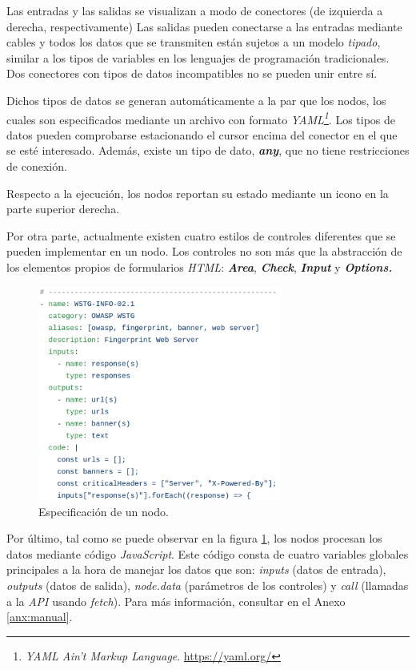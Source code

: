 Las entradas y las salidas se visualizan a modo de conectores (de izquierda a derecha, respectivamente) Las salidas pueden conectarse a las entradas mediante cables y todos los datos que se transmiten están sujetos a un modelo \textit{tipado}, similar a los tipos de variables en los lenguajes de programación tradicionales. Dos conectores con tipos de datos incompatibles no se pueden unir entre sí.\sn

Dichos tipos de datos se generan automáticamente a la par que los nodos, los cuales son especificados mediante un archivo con formato \textit{YAML\footnote{\textit{YAML Ain't Markup Language}. \url{https://yaml.org/}}}. Los tipos de datos pueden comprobarse estacionando el cursor encima del conector en el que se esté interesado. Además, existe un tipo de dato, \textbf{\textit{any}}, que no tiene restricciones de conexión.\sn

Respecto a la ejecución, los nodos reportan su estado mediante un icono en la parte superior derecha.

Por otra parte, actualmente existen cuatro estilos de controles diferentes que se pueden implementar en un nodo. Los controles no son más que la abstracción de los elementos propios de formularios \textit{HTML}: \textbf{\textit{Area}}, \textbf{\textit{Check}}, \textbf{\textit{Input}} y \textbf{\textit{Options.}}\sn

\begin{figure}[H]
    \centering
    \includegraphics[width=8cm]{img/tables/27_Ingredient-Spec.png}
    \caption{Especificación de un nodo.}
    \label{fig:ingredientspec}
\end{figure}

Por último, tal como se puede observar en la figura \ref{fig:ingredientspec}, los nodos procesan los datos mediante código \textit{JavaScript}. Este código consta de cuatro variables globales principales a la hora de manejar los datos que son: \textit{inputs} (datos de entrada), \textit{outputs} (datos de salida), \textit{node.data} (parámetros de los controles) y \textit{call} (llamadas a la \textit{API} usando \textit{fetch}). Para más información, consultar en el Anexo \ref{anx:manual}.\sn

